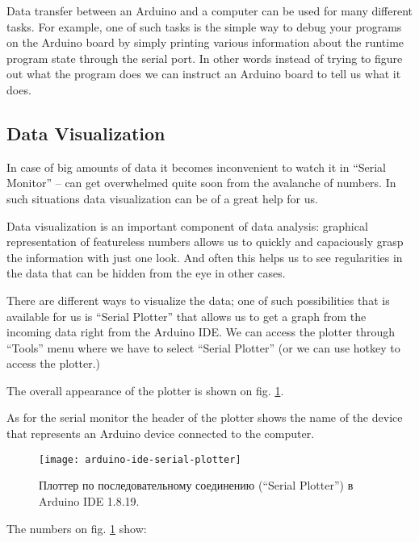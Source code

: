 \documentclass[../sparc.tex]{subfiles}
\begin{document}
Data transfer between an Arduino and a computer can be used for many different
tasks.  For example, one of such tasks is the simple way to debug your programs
on the Arduino board by simply printing various information about the runtime
program state through the serial port.  In other words instead of trying to
figure out what the program does we can instruct an Arduino board to tell us
what it does.

\subsection{Data Visualization}

In case of big amounts of data it becomes inconvenient to watch it in ``Serial
Monitor'' -- can get overwhelmed quite soon from the avalanche of numbers.  In
such situations data visualization can be of a great help for us.

Data visualization is an important component of data analysis: graphical
representation of featureless numbers allows us to quickly and capaciously grasp
the information with just one look.  And often this helps us to see regularities
in the data that can be hidden from the eye in other cases.

There are different ways to visualize the data; one of such possibilities that
is available for us is ``Serial Plotter'' that allows us to get a graph from the
incoming data right from the Arduino IDE.  We can access the plotter through
``Tools'' menu where we have to select ``Serial Plotter'' (or we can use
 hotkey to access the plotter.)

The overall appearance of the plotter is shown on
fig. \ref{fig:arduino-ide-serial-plotter}.

As for the serial monitor the header of the plotter shows the name of the device
that represents an Arduino device connected to the computer.

\begin{figure}[ht]
  \centering
  \texttt{[image: arduino-ide-serial-plotter]}
  \caption{Плоттер по последовательному соединению (``Serial Plotter'') в
    Arduino IDE 1.8.19.}
  \label{fig:arduino-ide-serial-plotter}
\end{figure}

The numbers on fig. \ref{fig:arduino-ide-serial-plotter} show:
\end{document}
